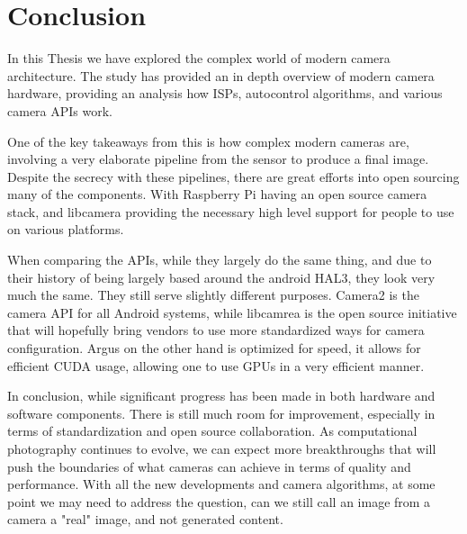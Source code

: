 \chapter{Conclusion\label{section:conclusions}}
In this Thesis we have explored the complex world of modern camera architecture.
The study has provided an in depth overview of modern camera hardware, providing
an analysis how ISPs, autocontrol algorithms, and various camera APIs work.

One of the key takeaways from this is how complex modern cameras are, involving
a very elaborate pipeline from the sensor to produce a final image.
Despite the secrecy with these pipelines, there are great efforts into open
sourcing many of the components. With Raspberry Pi having an open source camera
stack, and libcamera providing the necessary high level support for people to
use on various platforms.

When comparing the APIs, while they largely do the same thing, and due to their
history of being largely based around the android HAL3, they look very much the
same. They still serve slightly different purposes. Camera2 is the camera API
for all Android systems, while libcamrea is the open source initiative that
will hopefully bring vendors to use more standardized ways for camera
configuration. Argus on the other hand is optimized for speed, it allows for
efficient CUDA usage, allowing one to use GPUs in a very efficient manner.

In conclusion, while significant progress has been made in both hardware and
software components. There is still much room for improvement, especially in
terms of standardization and open source collaboration. As computational
photography continues to evolve, we can expect more breakthroughs that will
push the boundaries of what cameras can achieve in terms of quality and
performance. With all the new developments and camera algorithms, at some point
we may need to address the question, can we still call an image from a camera a
"real" image, and not generated content.
